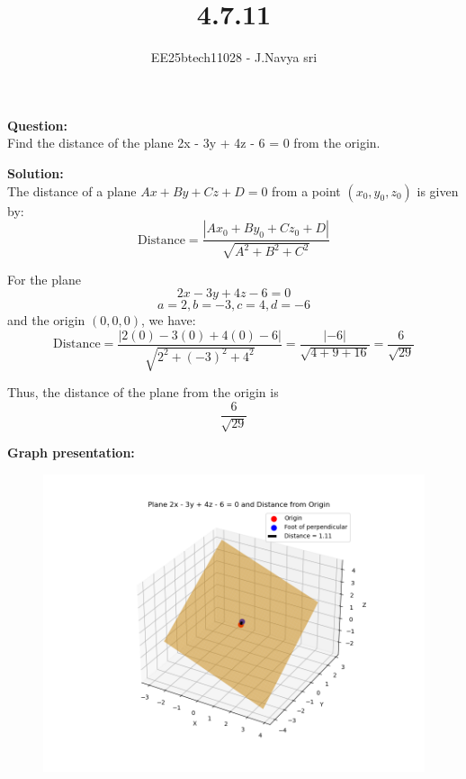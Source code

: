 \documentclass[journal]{IEEEtran}
\begin{document}

\vspace{3cm}

\title{4.7.11}
\author{EE25btech11028 - J.Navya sri}
{\let\newpage\relax\maketitle}


\textbf{Question:} \\
Find the distance of the plane 
2x - 3y + 4z - 6 = 0
from the origin.


\bigskip

\textbf{Solution:} \\
The distance of a plane $Ax + By + Cz + D = 0$ from a point $(x_0, y_0, z_0)$ is given by:
\begin{equation}
\text{Distance} = \frac{|A x_0 + B y_0 + C z_0 + D|}{\sqrt{A^2 + B^2 + C^2}}
\end{equation}

For the plane 
\begin{equation}
2x - 3y + 4z - 6 = 0
\end{equation} 
\[a = 2 , b = -3, c =4 , d = -6
\]
and the origin $(0,0,0)$, we have:
\begin{equation}
\text{Distance} = \frac{|2(0) - 3(0) + 4(0) - 6|}{\sqrt{2^2 + (-3)^2 + 4^2}}
= \frac{|-6|}{\sqrt{4 + 9 + 16}}
= \frac{6}{\sqrt{29}}
\end{equation}


Thus, the distance of the plane from the origin is 
\begin{equation}
\boxed{\frac{6}{\sqrt{29}}}
\end{equation}


\textbf{Graph presentation:}
\begin{figure}[H]
\begin{center}
\includegraphics[width=0.6\columnwidth]{Figs/fig7.png}
\end{center}
\caption{}
\label{fig:Fig}
\end{figure}
\end{document}
